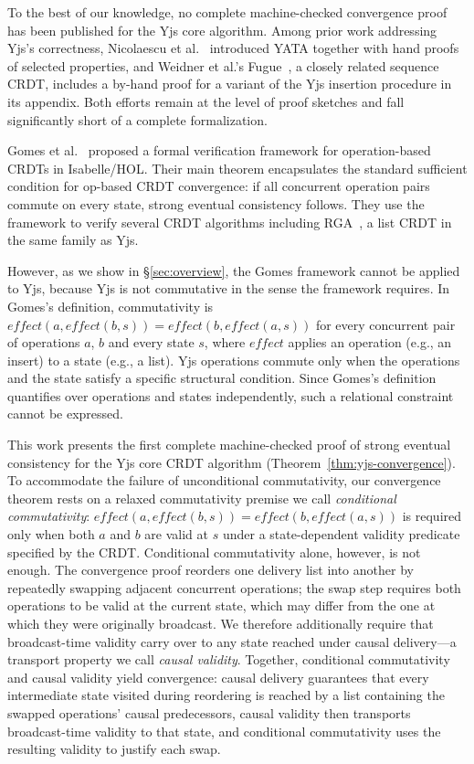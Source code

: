 \documentclass[sigplan,screen]{acmart}
\newcommand{\effect}{\mathit{effect}}
\begin{document}
To the best of our knowledge, no complete machine-checked convergence
proof has been published for the Yjs core algorithm.  Among prior work
addressing Yjs's correctness, Nicolaescu et al.~\cite{Nicolaescu2016}
introduced YATA together with hand proofs of selected properties, and
Weidner et al.'s Fugue~\cite{Weidner2023}, a closely related sequence
CRDT, includes a by-hand proof for a variant of the Yjs insertion
procedure in its appendix.  Both efforts remain at the level of proof
sketches and fall significantly short of a complete formalization.

Gomes et al.~\cite{Gomes2017} proposed a formal verification framework
for operation-based CRDTs in Isabelle/HOL.  Their main theorem
encapsulates the standard sufficient condition for op-based CRDT
convergence: if all concurrent operation pairs commute on every state,
strong eventual consistency follows.  They use the framework to verify
several CRDT algorithms including RGA~\cite{Roh2011}, a list CRDT in
the same family as Yjs.

However, as we show in \S\ref{sec:overview}, the Gomes framework cannot
be applied to Yjs, because Yjs is not commutative in the sense the
framework requires.  In Gomes's definition, commutativity is
$\effect(a, \effect(b, s)) = \effect(b, \effect(a, s))$ for every
concurrent pair of operations $a$, $b$ and every state $s$, where
$\effect$ applies an operation (e.g., an insert) to a state (e.g., a
list).  Yjs operations commute only when the operations and the state
satisfy a specific structural condition.  Since Gomes's definition
quantifies over operations and states independently, such a relational
constraint cannot be expressed.

This work presents the first complete machine-checked proof of strong
eventual consistency for the Yjs core CRDT algorithm
(Theorem~\ref{thm:yjs-convergence}).  To accommodate the failure of
unconditional commutativity, our convergence theorem rests on a
relaxed commutativity premise we call \emph{conditional commutativity}:
$\effect(a, \effect(b, s)) = \effect(b, \effect(a, s))$ is required
only when both $a$ and $b$ are valid at $s$ under a state-dependent
validity predicate specified by the CRDT.  Conditional commutativity
alone, however, is not enough.  The convergence proof reorders one
delivery list into another by repeatedly swapping adjacent concurrent
operations; the swap step requires both operations to be valid at the
current state, which may differ from the one at which they were
originally broadcast.  We therefore additionally require that
broadcast-time validity carry over to any state reached under causal
delivery---a transport property we call \emph{causal validity}.
Together, conditional commutativity and causal validity yield
convergence: causal delivery guarantees that every intermediate state
visited during reordering is reached by a list containing the swapped
operations' causal predecessors, causal validity then transports
broadcast-time validity to that state, and conditional commutativity
uses the resulting validity to justify each swap.
\end{document}
